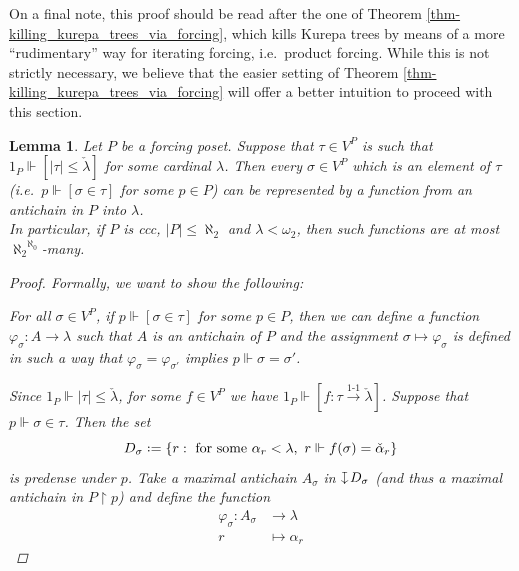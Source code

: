 \documentclass[11pt,a4paper]{report}
\newtheorem{lemma}[theorem]{Lemma}
\theoremstyle{definition}
\theoremstyle{num.custom-title}
\theoremstyle{custom-title}
\DeclareMathOperator{\restr}{\upharpoonright}
\newcommand{\inj}{\xrightarrow{\text{1-1}}}
\newcommand{\downmapsto}{%
           \mathrel{\raisebox{.1em}{%
							\rotatebox[origin=c]{-90}{$\mapsto$}}}}
\newcommand*{\defeq}{\mathrel{\rlap{%
                     \raisebox{0.3ex}{$\cdot$}}%
                     \raisebox{-0.3ex}{$\cdot$}}%
                     =}
\renewcommand{\phi}{\varphi}
\newcommand{\forces}{\Vdash}
\begin{document}
On a final note, this proof should be read after the one of Theorem \ref{thm-killing_kurepa_trees_via_forcing}, which kills Kurepa trees by means of a more ``rudimentary'' way for iterating forcing, i.e.\ product forcing. While this is not strictly necessary, we believe that the easier setting of Theorem \ref{thm-killing_kurepa_trees_via_forcing} will offer a better intuition to proceed with this section.





\begin{lemma}\label{lemma-names_determined_by_antichains}
Let $P$ be a forcing poset. Suppose that $\tau \in V^P$ is such that $1_P \Vdash [|\tau| \leq \check{\lambda}]$ for some cardinal $\lambda$. Then every $\sigma \in V^P$ which is an element of $\tau$ (i.e.\ $p \forces [\sigma \in \tau]$ for some $p \in P$) can be represented by a function from an antichain in $P$ into $\lambda$.\\
In particular, if $P$ is ccc, $|P| \leq \aleph_2$ and $\lambda < \omega_2$, then such functions are at most ${\aleph_2}^{\aleph_0}$-many.
\begin{proof}
Formally, we want to show the following:
\begin{center}
For all $\sigma \in V^P$, if $p \forces [\sigma \in \tau]$ for some $p \in P$, then we can define a function $\phi_\sigma \colon A \to \lambda$ such that $A$ is an antichain of $P$ and the assignment $\sigma \mapsto \phi_\sigma$ is defined in such a way that $\phi_\sigma = \phi_{\sigma'}$ implies $p \forces \sigma = \sigma'$.
\end{center}
Since $1_P \forces |\tau| \leq \check{\lambda}$, for some $f \in V^P$ we have $1_P \forces [f \colon \tau \inj \check{\lambda}]$. Suppose that $p \forces \sigma \in \tau$. Then the set
\[
D_\sigma \defeq \{r : \text{ for some } \alpha_r < \lambda, \ r \forces f(\sigma) = \check{\alpha}_r \}
\]
is predense under $p$. Take a maximal antichain $A_\sigma$ in $\downmapsto D_\sigma$ (and thus a maximal antichain in $P \restr p$) and define the function
\begin{align*}
\phi_\sigma \colon A_\sigma &\to \lambda \\
r &\mapsto \alpha_r
\end{align*}

\end{proof}
\end{lemma}
\end{document}
